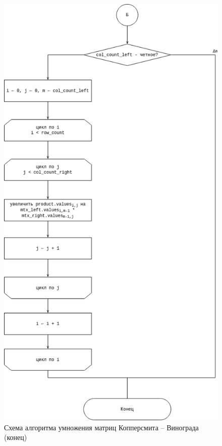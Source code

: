 \begin{figure}[H]
	\centering
	\includegraphics[width=0.7\linewidth]{assets/mtx-win3.drawio.png}
	\caption{Схема алгоритма умножения матриц Копперсмита -- Винограда (конец)}
	\label{fig:win-3}
\end{figure}

